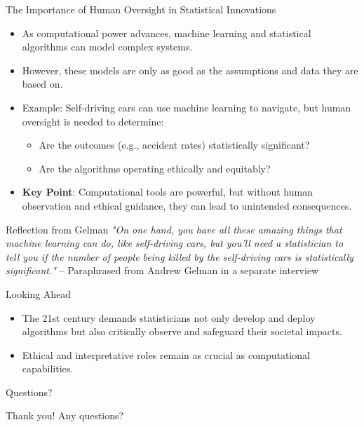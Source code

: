 \documentclass{beamer}
\begin{document}
\begin{frame}{The Importance of Human Oversight in Statistical Innovations}
\begin{itemize}
    \item As computational power advances, machine learning and statistical algorithms can model complex systems.
    \item However, these models are only as good as the assumptions and data they are based on.
    \item Example: Self-driving cars can use machine learning to navigate, but human oversight is needed to determine:
    \begin{itemize}
        \item Are the outcomes (e.g., accident rates) statistically significant?
        \item Are the algorithms operating ethically and equitably?
    \end{itemize}
    \item \textbf{Key Point}: Computational tools are powerful, but without human observation and ethical guidance, they can lead to unintended consequences.
\end{itemize}

\begin{block}{Reflection from Gelman}
\textit{"On one hand, you have all these amazing things that machine learning can do, like self-driving cars, but you'll need a statistician to tell you if the number of people being killed by the self-driving cars is statistically significant."} – Paraphrased from Andrew Gelman in a separate interview
\end{block}

\begin{block}{Looking Ahead}
\begin{itemize}
    \item The 21st century demands statisticians not only develop and deploy algorithms but also critically observe and safeguard their societal impacts.
    \item Ethical and interpretative roles remain as crucial as computational capabilities.
\end{itemize}
\end{block}
\end{frame}



\begin{frame}{Questions?}
\begin{center}
    Thank you! Any questions?
\end{center}
\end{frame}
\end{document}
